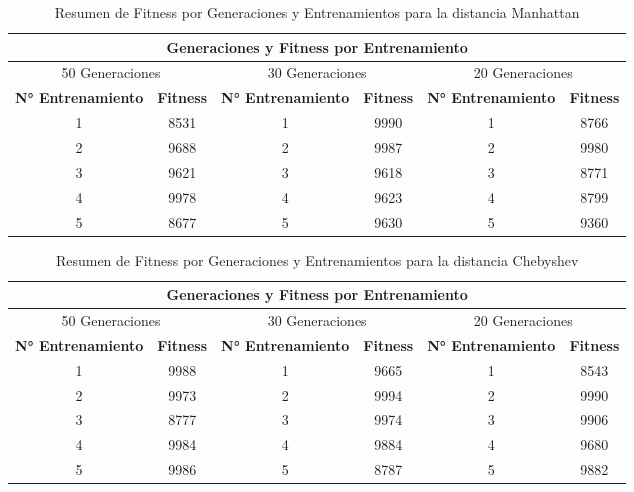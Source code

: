 \documentclass[lettersize, journal]{IEEEtran}
\begin{document}
\begin{table}[ht]
    \centering
    \caption{Resumen de Fitness por Generaciones y Entrenamientos para la distancia Manhattan}
    \label{tab:fitness_generaciones_manhattan}
    \begin{tabular}{cccccc}
        \toprule
        \multicolumn{6}{c}{Generaciones y Fitness por Entrenamiento} \\
        \midrule
        \multicolumn{2}{c}{50 Generaciones} & \multicolumn{2}{c}{30 Generaciones} & \multicolumn{2}{c}{20 Generaciones} \\
        \cmidrule(lr){1-2} \cmidrule(lr){3-4} \cmidrule(lr){5-6}
        \textbf{N° Entrenamiento} & \textbf{Fitness} & \textbf{N° Entrenamiento} & \textbf{Fitness} & \textbf{N° Entrenamiento} & \textbf{Fitness} \\
        \midrule
        1 & 8531 & 1 & 9990 & 1 & 8766 \\
        2 & 9688 & 2 & 9987 & 2 & 9980 \\
        3 & 9621 & 3 & 9618 & 3 & 8771 \\
        4 & 9978 & 4 & 9623 & 4 & 8799 \\
        5 & 8677 & 5 & 9630 & 5 & 9360 \\
        \bottomrule
    \end{tabular}
\end{table}

\begin{table}[ht]
    \centering
    \caption{Resumen de Fitness por Generaciones y Entrenamientos para la distancia Chebyshev}
    \label{tab:fitness_generaciones_chebyshev}
    \begin{tabular}{cccccc}
        \toprule
        \multicolumn{6}{c}{Generaciones y Fitness por Entrenamiento} \\
        \midrule
        \multicolumn{2}{c}{50 Generaciones} & \multicolumn{2}{c}{30 Generaciones} & \multicolumn{2}{c}{20 Generaciones} \\
        \cmidrule(lr){1-2} \cmidrule(lr){3-4} \cmidrule(lr){5-6}
        \textbf{N° Entrenamiento} & \textbf{Fitness} & \textbf{N° Entrenamiento} & \textbf{Fitness} & \textbf{N° Entrenamiento} & \textbf{Fitness} \\
        \midrule
        1 & 9988 & 1 & 9665 & 1 & 8543 \\
        2 & 9973 & 2 & 9994 & 2 & 9990 \\
        3 & 8777 & 3 & 9974 & 3 & 9906 \\
        4 & 9984 & 4 & 9884 & 4 & 9680 \\
        5 & 9986 & 5 & 8787 & 5 & 9882 \\
        \bottomrule
    \end{tabular}
\end{table}
\end{document}

